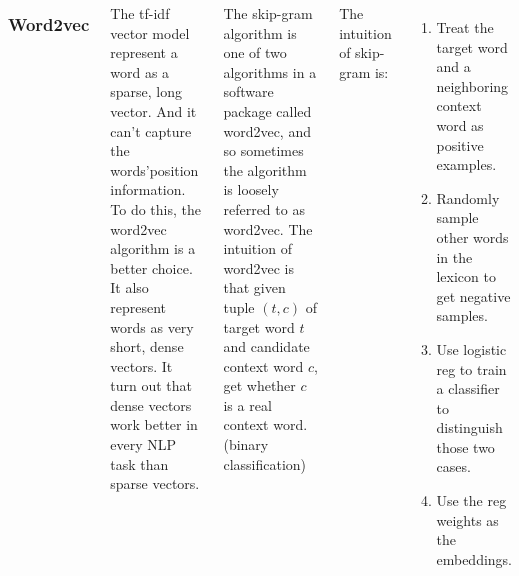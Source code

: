 \documentclass{tikzposter} %
\begin{document}
\begin{columns}
{    \subsubsection{Word2vec}
    The tf-idf vector model represent a word as a sparse, long vector. 
    And it can't capture the words'position information. 
    To do this, the word2vec algorithm is a better choice.
    It also represent words as very short, dense vectors. 
    It turn out that dense vectors work better in every NLP task than sparse vectors.
    
    The skip-gram algorithm is one of two algorithms in a software package called word2vec,
    and so sometimes the algorithm is loosely referred to as word2vec. The intuition of word2vec is that
    given tuple $(t, c)$ of target word $t$ and candidate context word $c$, get whether $c$ is a real context word. (binary classification)
    
    The intuition of skip-gram is:
    \begin{enumerate}
        \item Treat the target word and a neighboring context word as positive examples.
        \item Randomly sample other words in the lexicon to get negative samples.
        \item Use logistic reg to train a classifier to distinguish those two cases.
        \item Use the reg weights as the embeddings.
    \end{enumerate}
}


{


}






\end{columns}
\end{document}
